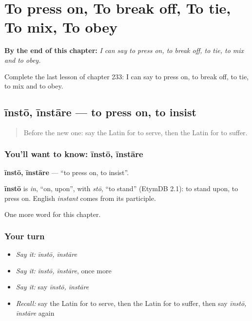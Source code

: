 
\chapter{To press on, To break off, To tie, To mix, To obey}
\label{ch:la-to-press-on-to-break-off-to-tie-to-mix-to-obey}

\begin{chapteropening}
\textbf{By the end of this chapter:} \emph{I can say to press on, to break off, to tie, to mix and to obey.}

Complete the last lesson of chapter 233: I can say to press on, to break off, to tie, to mix and to obey.
\end{chapteropening}

\section[īnstō, īnstāre]{īnstō, īnstāre — to press on, to insist}

\label{lesson:LA-C233-insto}



\begin{quote}
Before the new one: say the Latin for to serve, then the Latin for to suffer.
\end{quote}

\subsection*{You'll want to know: īnstō, īnstāre}
\textbf{īnstō, īnstāre} — \textquotedblleft{}to press on, to insist\textquotedblright{}.

\begin{cousinweb}
\textbf{īnstō} is \emph{in}, \textquotedblleft{}on, upon\textquotedblright{}, with \emph{stō}, \textquotedblleft{}to stand\textquotedblright{} (EtymDB 2.1): to stand upon, to press on. English \emph{instant} comes from its participle.
\end{cousinweb}

\begin{grammarlens}[title={What you've built}]
One more word for this chapter.
\end{grammarlens}

\subsection*{Your turn}
\begin{itemize}
\raggedright
  \item \emph{Say it:} \emph{īnstō, īnstāre}
  \item \emph{Say it:} \emph{īnstō, īnstāre}, once more
  \item \emph{Say it:} say \emph{īnstō, īnstāre}
  \item \emph{Recall:} say the Latin for to serve, then the Latin for to suffer, then say \emph{īnstō, īnstāre} again
\end{itemize}

